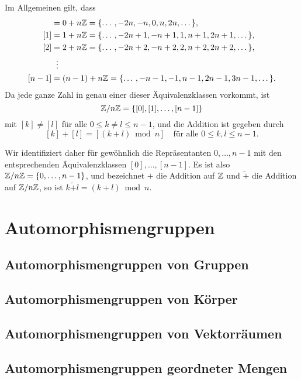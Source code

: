 Im Allgemeinen gilt, dass
\begin{align*}
 [0] &= 0+n\Zbb = \{\dotso, -2n, -n, 0, n, 2n, \dotso\}, \\
 [1] &= 1+n\Zbb = \{\dotso, -2n+1, -n+1, 1, n+1, 2n+1, \dotso\}, \\
 [2] &= 2+n\Zbb = \{\dotso, -2n+2, -n+2, 2, n+2, 2n+2, \dotso\}, \\
     &\;\;\vdots \\
 [n-1] &= (n-1)+n\Zbb = \{\dotso, -n-1, -1, n-1, 2n-1, 3n-1, \dotso\}.
\end{align*}
Da jede ganze Zahl in genau einer dieser Äquivalenzklassen vorkommt, ist
\[
 \mathbb{Z}/n\mathbb{Z} = \{[0], [1], \dotsc, [n-1]\}
\]
mit $[k] \neq [l]$ für alle $0 \leq k \neq l \leq n-1$, und die Addition ist gegeben durch
\[
 [k] + [l] = [(k+l) \bmod n]
 \quad
 \text{für alle $0 \leq k,l \leq n-1$}.
\]

Wir identifiziert daher für gewöhnlich die Repräsentanten $0, \dotsc, n-1$ mit den entsprechenden Äquivalenzklassen $[0], \dotsc, [n-1]$. Es ist also $\mathbb{Z}/n\mathbb{Z} = \{0, \dotsc, n-1\}$, und bezeichnet $+$ die Addition auf $\mathbb{Z}$ und $\tilde{+}$ die Addition auf $\mathbb{Z}/n\mathbb{Z}$, so ist $k \mathbin{\tilde{+}} l = (k+l) \bmod n$.





\section{Automorphismengruppen}


\subsection{Automorphismengruppen von Gruppen}


\subsection{Automorphismengruppen von Körper}


\subsection{Automorphismengruppen von Vektorräumen}


\subsection{Automorphismengruppen geordneter Mengen}


